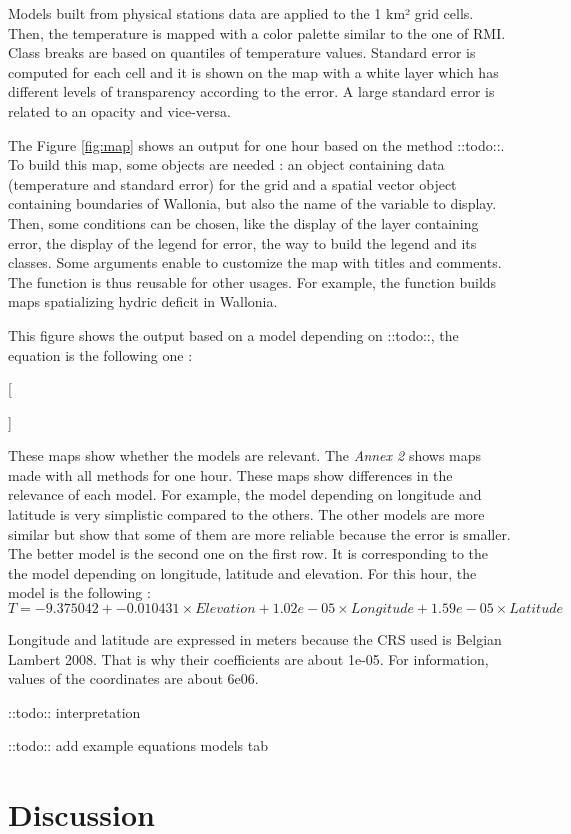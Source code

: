 \documentclass[12pt,twoside]{reedthesis}
\theoremstyle{definition}
\theoremstyle{definition}
\theoremstyle{definition}
\theoremstyle{remark}
\begin{document}
Models built from physical stations data are applied to the 1 km² grid
cells. Then, the temperature is mapped with a color palette similar to
the one of RMI. Class breaks are based on quantiles of temperature
values. Standard error is computed for each cell and it is shown on the
map with a white layer which has different levels of transparency
according to the error. A large standard error is related to an opacity
and vice-versa.

The Figure \ref{fig:map} shows an output for one hour based on the
method ::todo::. To build this map, some objects are needed : an object
containing data (temperature and standard error) for the grid and a
spatial vector object containing boundaries of Wallonia, but also the
name of the variable to display. Then, some conditions can be chosen,
like the display of the layer containing error, the display of the
legend for error, the way to build the legend and its classes. Some
arguments enable to customize the map with titles and comments. The
function is thus reusable for other usages. For example, the function
builds maps spatializing hydric deficit in Wallonia.

This figure shows the output based on a model depending on ::todo::, the
equation is the following one :

{[}

{]}

These maps show whether the models are relevant. The \emph{Annex 2}
shows maps made with all methods for one hour. These maps show
differences in the relevance of each model. For example, the model
depending on longitude and latitude is very simplistic compared to the
others. The other models are more similar but show that some of them are
more reliable because the error is smaller. The better model is the
second one on the first row. It is corresponding to the the model
depending on longitude, latitude and elevation. For this hour, the model
is the following : \[
T = -9.375042 + -0.010431 \times Elevation + 1.02e-05 \times Longitude + 1.59e-05 \times Latitude
\]

Longitude and latitude are expressed in meters because the CRS used is
Belgian Lambert 2008. That is why their coefficients are about 1e-05.
For information, values of the coordinates are about 6e06.

::todo:: interpretation

::todo:: add example equations models tab

\section{Discussion}\label{discussion}
\end{document}
